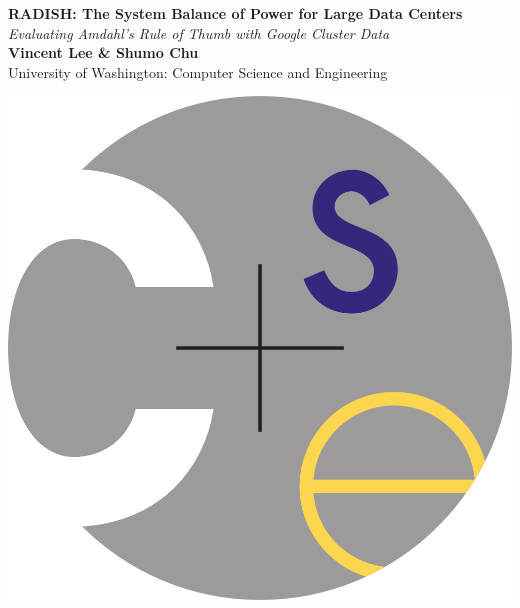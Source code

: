 \documentclass[a0,portrait]{a0poster}
\begin{document}


\begin{minipage}[b]{0.75\linewidth}
\veryHuge \color{NavyBlue} \textbf{RADISH: The System Balance of Power for Large Data Centers} \color{Black}\\ %
\Huge\textit{Evaluating Amdahl's Rule of Thumb with Google Cluster Data}\\[2cm] %
\huge \textbf{Vincent Lee \& Shumo Chu}\\[0.5cm] %
\huge University of Washington: Computer Science and Engineering\\[0.4cm] %
\end{minipage}
%
\begin{minipage}[b]{0.25\linewidth}
\includegraphics[width=20cm]{cse_logo.png}\\
\end{minipage}
\end{document}
